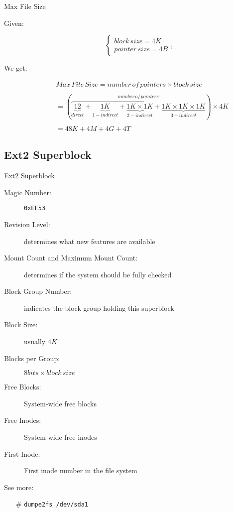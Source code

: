 \begin{frame}
  \begin{block}{Max File Size}
    \begin{description}
    \item[Given:]
      \begin{equation*}
        \begin{cases}
          block\,size=4K\\
          pointer\,size=4B
        \end{cases},
      \end{equation*}    
    \item[We get:]
      \begin{equation*}
        \begin{split}
          &Max\,File\,Size
          = number\,of\,pointers\times{}block\,size\\
          &\\
          &= (\overbrace{\underbrace{12}_{direct} + \underbrace{1K}_{1-indirect} +
            \underbrace{1K\times{}1K}_{2-indirect} +
            \underbrace{1K\times{}1K\times{}1K}_{3-indirect}}^{number\,of\,pointers})\times{}4K\\
          &\\
          &= 48K + 4M + 4G + 4T
        \end{split}
      \end{equation*}
    \end{description}
  \end{block}
\end{frame}

\subsection{Ext2 Superblock}

\begin{frame}{Ext2 Superblock}
  \begin{description}
  \item[Magic Number:] \texttt{0xEF53}
  \item[Revision Level:] determines what new features are available
  \item[Mount Count and Maximum Mount Count:] determines if the system should be
    fully checked
  \item[Block Group Number:] indicates the block group holding this superblock
  \item[Block Size:] usually $4K$
  \item[Blocks per Group:] $8bits\times{}block\,size$
  \item[Free Blocks:] System-wide free blocks
  \item[Free Inodes:] System-wide free inodes
  \item[First Inode:] First inode number in the file system
  \end{description}
  See more:
  \begin{itemize}
  \item[\#] \texttt{dumpe2fs /dev/sda1}
  \end{itemize}
\end{frame}


